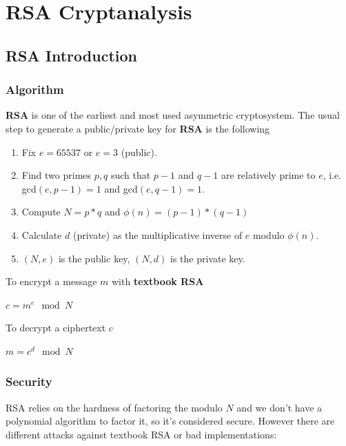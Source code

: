 \documentclass[a4paper,12pt]{report}
\begin{document}
\chapter{RSA Cryptanalysis}


\section{RSA Introduction}

\subsection{Algorithm}

\textbf{RSA} is one of the earliest and most used asymmetric cryptosystem.
The usual step to generate a public/private key for \textbf{RSA} is the following

\begin{enumerate}
    \item Fix $e = 65537$ or $e = 3$ (public).
    \item Find two primes $p, q$ such that $p - 1$ and $q - 1$ are relatively prime to $e$, i.e. gcd$(e, p-1) = 1$ and gcd$(e, q-1) = 1$.
    \item Compute $N = p * q$ and $\phi(n) = (p-1) * (q-1)$
    \item Calculate $d$ (private) as the multiplicative inverse of $e$ modulo $\phi(n)$.
    \item $(N, e)$ is the public key, $(N, d)$ is the private key.
\end{enumerate}

To encrypt a message $m$ with \textbf{textbook RSA}

\begin{center}
    $c = m^e \mod N$
\end{center}

To decrypt a ciphertext $c$

\begin{center}
    $m = c^d \mod N$
\end{center}

\subsection{Security}

RSA relies on the hardness of factoring the modulo $N$ and we don't have a polynomial algorithm to factor it, so it's considered secure.
However there are different attacks against textbook RSA or bad implementations:
\end{document}
